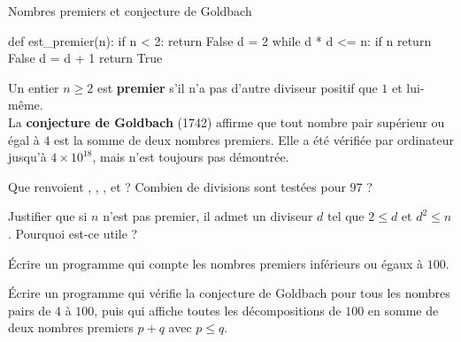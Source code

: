 \begin{exercice}[3]{Nombres premiers et conjecture de Goldbach}
\begin{codecote}[0.42]
\begin{pythoncol}
def est_premier(n):
    if n < 2:
        return False
    d = 2
    while d * d <= n:
        if n %
            return False
        d = d + 1
    return True
\end{pythoncol}
\cote
Un entier $n\geq2$ est \textbf{premier} s'il n'a pas d'autre diviseur positif que $1$ et lui-même.\\[1mm]
La \textbf{conjecture de Goldbach} (1742) affirme que tout nombre pair supérieur ou égal à $4$ est la somme de deux nombres premiers.
Elle a été vérifiée par ordinateur jusqu'à $4\times10^{18}$, mais n'est toujours pas démontrée.
\end{codecote}
\begin{questions}
  \item Que renvoient , , ,  et
     ? Combien de divisions sont testées pour $97$ ?
  \item Justifier que si $n$ n'est pas premier, il admet un diviseur $d$ tel que $2\leq d$ et $d^{2}\leq n$. Pourquoi est-ce utile ?
  \item Écrire un programme qui compte les nombres premiers inférieurs ou égaux à $100$.
  \item Écrire un programme qui vérifie la conjecture de Goldbach pour tous les nombres pairs de $4$ à $100$, puis qui affiche toutes
    les décompositions de $100$ en somme de deux nombres premiers $p+q$ avec $p\leq q$.
\end{questions}
\end{exercice}
